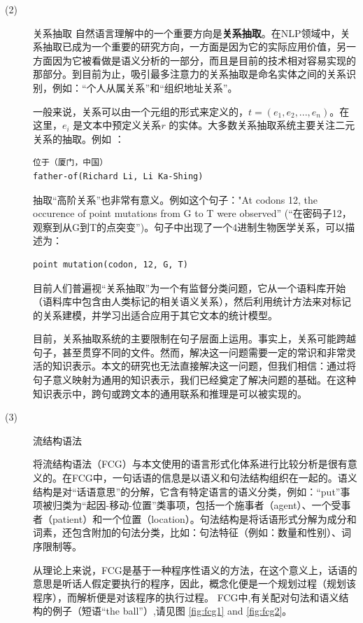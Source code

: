 \begin{enumerate}
\begin{description}
\item[(2)]{关系抽取}
自然语言理解中的一个重要方向是{\bf 关系抽取}。在NLP领域中，关系抽取已成为一个重要的研究方向，一方面是因为它的实际应用价值，另一方面因为它被看做是语义分析的一部分，而且是目前的技术相对容易实现的那部分。到目前为止，吸引最多注意力的关系抽取是命名实体之间的关系识别，例如：“个人从属关系”和“组织地址关系”。

一般来说，关系可以由一个元组的形式来定义的，$t = (e_1, e_2, ...,e_n)$。在这里，$e_i$ 是文本中预定义关系$r$ 的实体。大多数关系抽取系统主要关注二元关系的抽取。例如 ：

\begin{verbatim}
位于（厦门，中国）
father-of(Richard Li, Li Ka-Shing)
\end{verbatim}

抽取“高阶关系”也非常有意义。例如这个句子："At codons 12, the occurence of point mutations from G to T were observed'' (“在密码子12，观察到从G到T的点突变”)。句子中出现了一个4进制生物医学关系，可以描述为：

\begin{verbatim}
point mutation(codon, 12, G, T)
\end{verbatim}

目前人们普遍视“关系抽取”为一个有监督分类问题，它从一个语料库开始（语料库中包含由人类标记的相关语义关系），然后利用统计方法来对标记的关系建模，并学习出适合应用于其它文本的统计模型。

目前，关系抽取系统的主要限制在句子层面上运用。事实上，关系可能跨越句子，甚至贯穿不同的文件。然而，解决这一问题需要一定的常识和非常灵活的知识表示。本文的研究也无法直接解决这一问题，但我们相信：通过将句子意义映射为通用的知识表示，我们已经奠定了解决问题的基础。在这种知识表示中，跨句或跨文本的通用联系和推理是可以被实现的。

\item[(3)]{流结构语法}


将流结构语法（FCG）与本文使用的语言形式化体系进行比较分析是很有意义的。在FCG中，一句话语的信息是以语义和句法结构组织在一起的。语义结构是对“话语意思”的分解，它含有特定语言的语义分类，例如：“put”事项被归类为“起因-移动-位置”类事项，包括一个施事者（agent）、一个受事者（patient）和一个位置（location）。句法结构是将话语形式分解为成分和词素，还包含附加的句法分类，比如：句法特征（例如：数量和性别）、词序限制等。


从理论上来说，FCG是基于一种程序性语义的方法，在这个意义上，话语的意思是听话人假定要执行的程序，因此，概念化便是一个规划过程（规划该程序），而解析便是对该程序的执行过程。
FCG中,有关配对句法和语义结构的例子（短语“the ball”）,请见图 \ref{fig:fcg1} and \ref{fig:fcg2}。


\end{description}
\end{enumerate}
